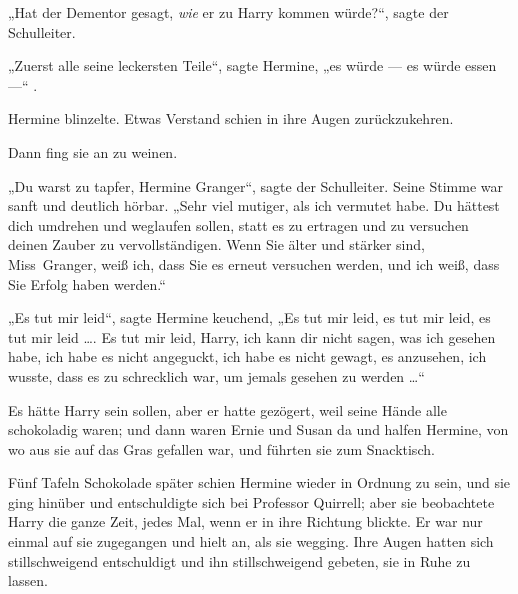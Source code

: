 „Hat der Dementor gesagt, \emph{wie} er zu Harry kommen würde?“, sagte der Schulleiter.

„Zuerst alle seine leckersten Teile“, sagte Hermine, „es würde — es würde essen —“ .

Hermine blinzelte. Etwas Verstand schien in ihre Augen zurückzukehren.

Dann fing sie an zu weinen.

„Du warst zu tapfer, Hermine Granger“, sagte der Schulleiter. Seine Stimme war sanft und deutlich hörbar.
„Sehr viel mutiger, als ich vermutet habe. Du hättest dich umdrehen und weglaufen sollen, statt es zu ertragen und zu versuchen deinen Zauber zu vervollständigen. Wenn Sie älter und stärker sind, Miss~Granger, weiß ich, dass Sie es erneut versuchen werden, und ich weiß, dass Sie Erfolg haben werden.“

„Es tut mir leid“, sagte Hermine keuchend,
„Es tut mir leid, es tut mir leid, es tut mir leid …. Es tut mir leid, Harry, ich kann dir nicht sagen, was ich gesehen habe, ich habe es nicht angeguckt, ich habe es nicht gewagt, es anzusehen, ich wusste, dass es zu schrecklich war, um jemals gesehen zu werden …“

Es hätte Harry sein sollen, aber er hatte gezögert, weil seine Hände alle schokoladig waren; und dann waren Ernie und Susan da und halfen Hermine, von wo aus sie auf das Gras gefallen war, und führten sie zum Snacktisch.

Fünf Tafeln Schokolade später schien Hermine wieder in Ordnung zu sein, und sie ging hinüber und entschuldigte sich bei Professor Quirrell; aber sie beobachtete Harry die ganze Zeit, jedes Mal, wenn er in ihre Richtung blickte. Er war nur einmal auf sie zugegangen und hielt an, als sie wegging. Ihre Augen hatten sich stillschweigend entschuldigt und ihn stillschweigend gebeten, sie in Ruhe zu lassen.


